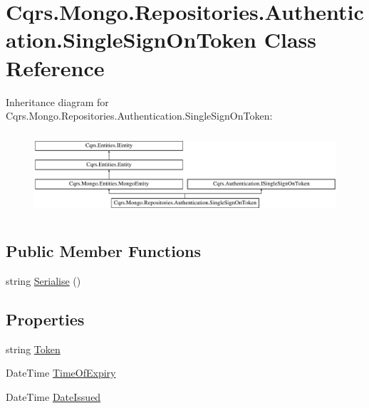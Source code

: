 \hypertarget{classCqrs_1_1Mongo_1_1Repositories_1_1Authentication_1_1SingleSignOnToken}{}\section{Cqrs.\+Mongo.\+Repositories.\+Authentication.\+Single\+Sign\+On\+Token Class Reference}
\label{classCqrs_1_1Mongo_1_1Repositories_1_1Authentication_1_1SingleSignOnToken}
Inheritance diagram for Cqrs.\+Mongo.\+Repositories.\+Authentication.\+Single\+Sign\+On\+Token\+:\begin{figure}[H]
\begin{center}
\leavevmode
\includegraphics[height=3.102493cm]{classCqrs_1_1Mongo_1_1Repositories_1_1Authentication_1_1SingleSignOnToken}
\end{center}
\end{figure}
\subsection*{Public Member Functions}
\begin{DoxyCompactItemize}
\item 
string \hyperlink{classCqrs_1_1Mongo_1_1Repositories_1_1Authentication_1_1SingleSignOnToken_ab0ad6b0a6065a2553a093214e5a033b5}{Serialise} ()
\end{DoxyCompactItemize}
\subsection*{Properties}
\begin{DoxyCompactItemize}
\item 
string \hyperlink{classCqrs_1_1Mongo_1_1Repositories_1_1Authentication_1_1SingleSignOnToken_a48105fdf07433e74837cdc922d0b2d1f}{Token}
\item 
Date\+Time \hyperlink{classCqrs_1_1Mongo_1_1Repositories_1_1Authentication_1_1SingleSignOnToken_a8f4e70b3498d48ae914f02890750d096}{Time\+Of\+Expiry}
\item 
Date\+Time \hyperlink{classCqrs_1_1Mongo_1_1Repositories_1_1Authentication_1_1SingleSignOnToken_a92a25011e2a4a44e5fb99c4ee9f75f4d}{Date\+Issued}
\end{DoxyCompactItemize}


